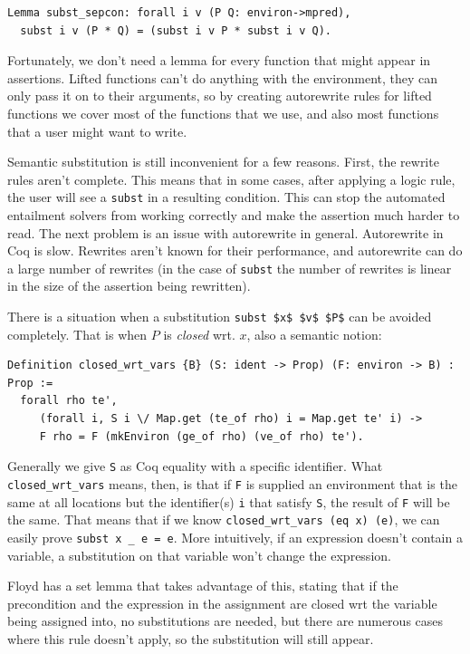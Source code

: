 \documentclass{puthesis}
\begin{document}
\begin{verbatim}
Lemma subst_sepcon: forall i v (P Q: environ->mpred),
  subst i v (P * Q) = (subst i v P * subst i v Q).
\end{verbatim}

Fortunately, we don't need a lemma for every function that might
appear in assertions. Lifted functions can't do anything with the
environment, they can only pass it on to their arguments, so
by creating autorewrite rules for lifted functions we cover
most of the functions that we use, and also most functions
that a user might want to write. 

Semantic substitution is still inconvenient for a few reasons. First,
the rewrite rules aren't complete. This means that in some cases, after
applying a logic rule, the user will see a \lstinline|subst| in a
resulting condition. This can stop the automated entailment
solvers from working correctly and make the assertion much harder
to read. The next problem is an issue with autorewrite in general.
Autorewrite in Coq is slow. Rewrites aren't known for their 
performance, and autorewrite can do a large number of rewrites
(in the case of \lstinline|subst| the number of rewrites is
linear in the size of the assertion being rewritten). 

There is a situation when a substitution \lstinline|subst $x$ $v$ $P$| can
be avoided completely. That is when $P$ is \emph{closed} wrt. 
$x$, also a semantic notion:

\begin{verbatim}
Definition closed_wrt_vars {B} (S: ident -> Prop) (F: environ -> B) : Prop := 
  forall rho te',  
     (forall i, S i \/ Map.get (te_of rho) i = Map.get te' i) ->
     F rho = F (mkEnviron (ge_of rho) (ve_of rho) te').
\end{verbatim}

Generally we give \lstinline|S| as Coq equality with a specific
identifier.  What \lstinline|closed_wrt_vars| means, then, is that if
\lstinline|F| is supplied an environment that is the same at all
locations but the identifier(s) \lstinline|i| that satisfy
\lstinline|S|, the result of \lstinline|F| will be the same. That
means that if we know \lstinline|closed_wrt_vars (eq x) (e)|, we can
easily prove \lstinline|subst x _ e = e|. More intuitively, if an
expression doesn't contain a variable, a substitution on that variable
won't change the expression.

Floyd has a set lemma that takes advantage of this, stating that if
the precondition and the expression in the assignment are closed wrt
the variable being assigned into, no substitutions are needed, but
there are numerous cases where this rule doesn't apply, so the
substitution will still appear.
\end{document}
